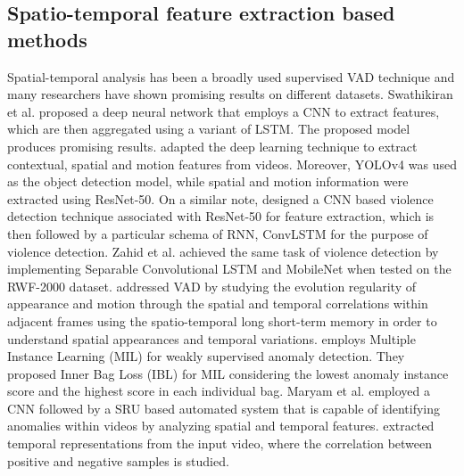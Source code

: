 \documentclass[runningheads]{llncs}
\begin{document}
\subsection{Spatio-temporal feature extraction based methods}
Spatial-temporal analysis has been a broadly used supervised VAD technique and many researchers have shown promising results on different datasets. Swathikiran et al. \cite{sudhakaran} proposed a deep neural network that employs a CNN to extract features, which are then aggregated using a variant of LSTM. The proposed model produces promising results. \cite{petrocchi} adapted the deep learning technique to extract contextual, spatial and motion features from videos. Moreover, YOLOv4 was used as the object detection model, while spatial and motion information were extracted using ResNet-50. On a similar note, \cite{vosta2022cnn} designed a CNN based violence detection technique associated with ResNet-50 for feature extraction, which is then followed by a particular schema of RNN, ConvLSTM for the purpose of violence detection. Zahid et al. \cite{islam2021efficient} achieved the same task of violence detection by implementing Separable Convolutional LSTM and MobileNet when tested on the RWF-2000 dataset. \cite{zhang2019temporal} addressed VAD by studying the evolution regularity of appearance and motion through the spatial and temporal correlations within adjacent frames using the spatio-temporal long short-term memory in order to understand spatial appearances and temporal variations.\cite{zhao2022exploiting} employs Multiple Instance Learning (MIL) for weakly supervised anomaly detection. They proposed Inner Bag Loss (IBL) for MIL considering the lowest anomaly instance score and the highest score in each individual bag. Maryam et al. \cite{qasim2023video} employed a CNN followed by a SRU based automated system that is capable of identifying anomalies within videos by analyzing spatial and temporal features. \cite{shao2023video} extracted temporal representations from the input video, where the correlation between positive and negative samples is studied. 
\end{document}
